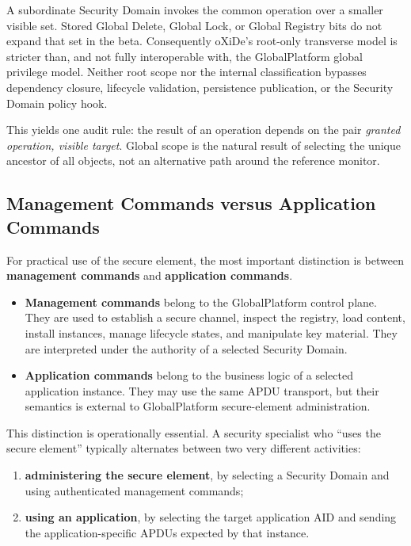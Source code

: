 A subordinate Security Domain invokes the common operation over a smaller
visible set. Stored Global Delete, Global Lock, or Global Registry bits do not
expand that set in the beta. Consequently oXiDe's root-only transverse model is
stricter than, and not fully interoperable with, the GlobalPlatform global
privilege model. Neither root scope nor the internal classification bypasses
dependency closure, lifecycle validation, persistence publication, or the
Security Domain policy hook.

This yields one audit rule: the result of an operation depends on the pair
\emph{granted operation, visible target}. Global scope is the natural result
of selecting the unique ancestor of all objects, not an alternative path
around the reference monitor.

\subsection{Management Commands versus Application Commands}
\label{sec:gp-management-vs-application}


For practical use of the secure element, the most important distinction is
between \textbf{management commands} and \textbf{application commands}.

\begin{itemize}
\item \textbf{Management commands} belong to the GlobalPlatform control
  plane. They are used to establish a secure channel, inspect the
  registry, load content, install instances, manage lifecycle states, and
  manipulate key material. They are interpreted under the authority of a
  selected Security Domain.
\item \textbf{Application commands} belong to the business logic of a
  selected application instance. They may use the same APDU transport, but
  their semantics is external to GlobalPlatform secure-element administration.
\end{itemize}

This distinction is operationally essential. A security specialist who
``uses the secure element'' typically alternates between two very
different activities:

\begin{enumerate}
\item \textbf{administering the secure element}, by selecting a Security Domain and
  using authenticated management commands;
\item \textbf{using an application}, by selecting the target application
  AID and sending the application-specific APDUs expected by that
  instance.
\end{enumerate}

